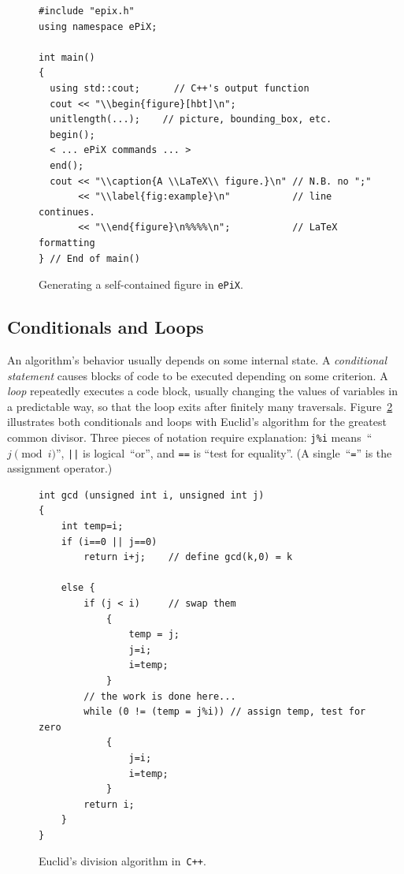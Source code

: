 \documentclass[12pt]{report}
\newcommand{\code}[1]{\texttt{#1}}
\newcommand{\ePiX}{\code{ePiX}}
\newcommand{\CXX}{\code{C++}}
\begin{document}
\begin{figure}
\begin{footnotesize}
\begin{verbatim}
#include "epix.h"
using namespace ePiX;

int main() 
{
  using std::cout;      // C++'s output function
  cout << "\\begin{figure}[hbt]\n";
  unitlength(...);    // picture, bounding_box, etc.
  begin();
  < ... ePiX commands ... >
  end();
  cout << "\\caption{A \\LaTeX\\ figure.}\n" // N.B. no ";"
       << "\\label{fig:example}\n"           // line continues.
       << "\\end{figure}\n%%%%\n";           // LaTeX formatting
} // End of main()
\end{verbatim}
\end{footnotesize}
\caption{Generating a self-contained figure in \ePiX.}
\label{fig:captioned}
\end{figure}


\subsection*{Conditionals and Loops}

An algorithm's behavior usually depends on some internal state. A
\emph{conditional statement} causes blocks of code to be executed
depending on some criterion. A \emph{loop} repeatedly executes a code
block, usually changing the values of variables in a predictable way,
so that the loop exits after finitely many traversals.
Figure~\ref{fig:gcd} illustrates both conditionals and loops with
Euclid's algorithm for the greatest common divisor. Three pieces of
notation require explanation: \code{j\%i} means~``$j\pmod i$'',
\code{||} is logical~``or'', and \code{==} is ``test for equality''.
(A single~``\code{=}'' is the assignment operator.)
\begin{figure}[hbt]
\begin{footnotesize}
\begin{verbatim}
int gcd (unsigned int i, unsigned int j)
{
    int temp=i;
    if (i==0 || j==0)
        return i+j;    // define gcd(k,0) = k

    else {
        if (j < i)     // swap them
            {
                temp = j;
                j=i;
                i=temp;
            }
        // the work is done here...
        while (0 != (temp = j%i)) // assign temp, test for zero
            {
                j=i;
                i=temp;
            }
        return i;
    }
}
\end{verbatim}
\end{footnotesize}
\caption{Euclid's division algorithm in~\CXX.}
\label{fig:gcd}
\end{figure}
\end{document}
